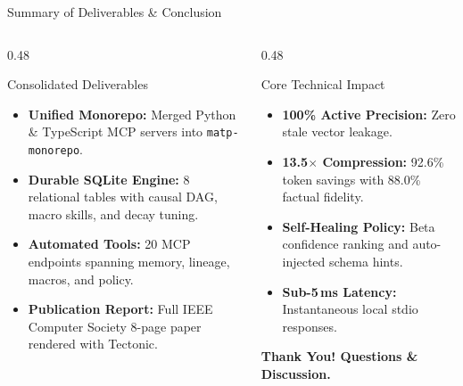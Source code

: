 \documentclass[aspectratio=169,10pt]{beamer}
\begin{document}
\begin{frame}{Summary of Deliverables \& Conclusion}
  \begin{columns}[T,onlytextwidth]
    \begin{column}{0.48\textwidth}
      \begin{block}{Consolidated Deliverables}
        \begin{itemize}
          \item \textbf{Unified Monorepo:} Merged Python \& TypeScript MCP servers into \texttt{matp-monorepo}.
          \item \textbf{Durable SQLite Engine:} 8 relational tables with causal DAG, macro skills, and decay tuning.
          \item \textbf{Automated Tools:} 20 MCP endpoints spanning memory, lineage, macros, and policy.
          \item \textbf{Publication Report:} Full IEEE Computer Society 8-page paper rendered with Tectonic.
        \end{itemize}
      \end{block}
    \end{column}

    \begin{column}{0.48\textwidth}
      \begin{exampleblock}{Core Technical Impact}
        \begin{itemize}
          \item \textbf{100\% Active Precision:} Zero stale vector leakage.
          \item \textbf{13.5$\times$ Compression:} 92.6\% token savings with 88.0\% factual fidelity.
          \item \textbf{Self-Healing Policy:} Beta confidence ranking and auto-injected schema hints.
          \item \textbf{Sub-5\,ms Latency:} Instantaneous local stdio responses.
        \end{itemize}
      \end{exampleblock}
      \vspace{0.4em}
      \centering
      \textbf{Thank You! Questions \& Discussion.}
    \end{column}
  \end{columns}
\end{frame}
\end{document}
